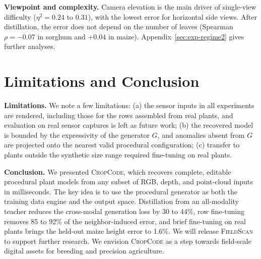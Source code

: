 \documentclass[10pt,twocolumn,letterpaper]{article}
\newcommand{\method}{\textsc{CropCode}}
\newcommand{\dataset}{\textsc{FieldScan}}
\begin{document}
\noindent\textbf{Viewpoint and complexity.}
Camera elevation is the main driver of single-view difficulty ($\eta^2 = 0.24$ to $0.31$), with the lowest error for horizontal side views. After distillation, the error does not depend on the number of leaves (Spearman $\rho = -0.07$ in sorghum and $+0.04$ in maize). Appendix~\ref{sec:exp-regime2} gives further analyses.

\section{Limitations and Conclusion}
\label{sec:discussion}\label{sec:conclusion}

\noindent\textbf{Limitations.}
We note a few limitations: (a) the sensor inputs in all experiments are rendered, including those for the rows assembled from real plants, and evaluation on real sensor captures is left as future work; (b) the recovered model is bounded by the expressivity of the generator $G$, and anomalies absent from $G$ are projected onto the nearest valid procedural configuration; (c) transfer to plants outside the synthetic size range required fine-tuning on real plants. %
%

\noindent\textbf{Conclusion.}
We presented \method{}, which recovers complete, editable procedural plant models from any subset of RGB, depth, and point-cloud inputs in milliseconds. The key idea is to use the procedural generator as both the training data engine and the output space. Distillation from an all-modality teacher reduces the cross-modal generation loss by 30 to 44\%, row fine-tuning removes 85 to 92\% of the neighbor-induced error, and brief fine-tuning on real plants brings the held-out maize height error to 1.6\%. We will release \dataset{} to support further research. We envision \method{} as a step towards field-scale digital assets for breeding and precision agriculture.

\clearpage %



\appendix
\clearpage
\end{document}
